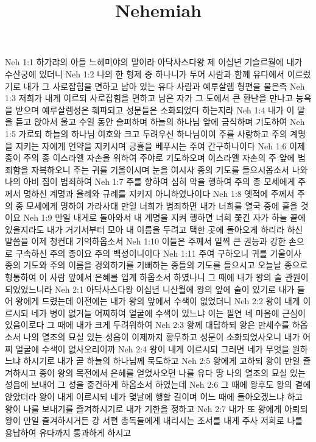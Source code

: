 

\title{Nehemiah}

Neh 1:1  하가랴의 아들 느헤미야의 말이라 아닥사스다왕 제 이십년 기슬르월에 내가 수산궁에 있더니
Neh 1:2  나의 한 형제 중 하나니가 두어 사람과 함께 유다에서 이르렀기로 내가 그 사로잡힘을 면하고 남아 있는 유다 사람과 예루살렘 형편을 물은즉
Neh 1:3  저희가 내게 이르되 사로잡힘을 면하고 남은 자가 그 도에서 큰 환난을 만나고 능욕을 받으며 예루살렘성은 훼파되고 성문들은 소화되었다 하는지라
Neh 1:4  내가 이 말을 듣고 앉아서 울고 수일 동안 슬퍼하며 하늘의 하나님 앞에 금식하며 기도하여
Neh 1:5  가로되 하늘의 하나님 여호와 크고 두려우신 하나님이여 주를 사랑하고 주의 계명을 지키는 자에게 언약을 지키시며 긍휼을 베푸시는 주여 간구하나이다
Neh 1:6  이제 종이 주의 종 이스라엘 자손을 위하여 주야로 기도하오며 이스라엘 자손의 주 앞에 범죄함을 자복하오니 주는 귀를 기울이시며 눈을 여시사 종의 기도를 들으시옵소서 나와 나의 아비 집이 범죄하여
Neh 1:7  주를 향하여 심히 악을 행하여 주의 종 모세에게 주께서 명하신 계명과 율례와 규례를 지키지 아니하였나이다
Neh 1:8  옛적에 주께서 주의 종 모세에게 명하여 가라사대 만일 너희가 범죄하면 내가 너희를 열국 중에 흩을 것이요
Neh 1:9  만일 내게로 돌아와서 내 계명을 지켜 행하면 너희 쫓긴 자가 하늘 끝에 있을지라도 내가 거기서부터 모아 내 이름을 두려고 택한 곳에 돌아오게 하리라 하신 말씀을 이제 청컨대 기억하옵소서
Neh 1:10  이들은 주께서 일찍 큰 권능과 강한 손으로 구속하신 주의 종이요 주의 백성이니이다
Neh 1:11  주여 구하오니 귀를 기울이사 종의 기도와 주의 이름을 경외하기를 기뻐하는 종들의 기도를 들으시고 오늘날 종으로 형통하여 이 사람 앞에서 은혜를 입게 하옵소서 하였나니 그 때에 내가 왕의 술 관원이 되었었느니라
Neh 2:1  아닥사스다왕 이십년 니산월에 왕의 앞에 술이 있기로 내가 들어 왕에게 드렸는데 이전에는 내가 왕의 앞에서 수색이 없었더니
Neh 2:2  왕이 내게 이르시되 네가 병이 없거늘 어찌하여 얼굴에 수색이 있느냐 이는 필연 네 마음에 근심이 있음이로다 그 때에 내가 크게 두려워하여
Neh 2:3  왕께 대답하되 왕은 만세수를 하옵소서 나의 열조의 묘실 있는 성읍이 이제까지 황무하고 성문이 소화되었사오니 내가 어찌 얼굴에 수색이 없사오리이까
Neh 2:4  왕이 내게 이르시되 그러면 네가 무엇을 원하느냐 하시기로 내가 곧 하늘의 하나님께 묵도하고
Neh 2:5  왕에게 고하되 왕이 만일 즐겨하시고 종이 왕의 목전에서 은혜를 얻었사오면 나를 유다 땅 나의 열조의 묘실 있는 성읍에 보내어 그 성을 중건하게 하옵소서 하였는데
Neh 2:6  그 때에 왕후도 왕의 곁에 앉았더라 왕이 내게 이르시되 네가 몇날에 행할 길이며 어느 때에 돌아오겠느냐 하고 왕이 나를 보내기를 즐겨하시기로 내가 기한을 정하고
Neh 2:7  내가 또 왕에게 아뢰되 왕이 만일 즐겨하시거든 강 서편 총독들에게 내리시는 조서를 내게 주사 저희로 나를 용납하여 유다까지 통과하게 하시고
